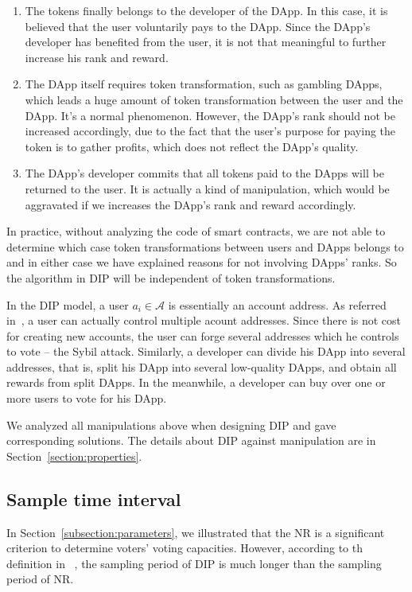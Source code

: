   \begin{enumerate}
  	 \item The tokens finally belongs to the developer of the DApp. In this case, it is believed that the user voluntarily pays to the DApp. Since the DApp's developer has benefited from the user, it is not that meaningful to further increase his rank and reward. 
  	\item The DApp itself requires token transformation, such as gambling DApps, which leads  a huge amount of token transformation between the user and the DApp. It's a normal phenomenon. However, the DApp's rank should not be increased accordingly, due to the fact that the user's purpose for paying the token is to gather profits, which does not reflect the DApp's quality.  
   \item The DApp's developer commits that all tokens paid to the DApps will be returned to the user. It is actually a kind of manipulation, which would be aggravated if we increases the DApp's rank and reward accordingly.  
  \end{enumerate}
  In practice, without analyzing the code of smart contracts, we are not able to determine which case token transformations between users and DApps belongs to and in either case we have explained reasons for not involving DApps' ranks. So the algorithm in DIP will be independent of token transformations. 
  
  In the DIP model, a user $a_i \in \mathcal{A}$ is essentially an account address. As referred in~\cite{Nebulasyellowpaper}, a user can actually control multiple acount addresses. Since there is not cost for creating new accounts, the user can forge several addresses which he controls to vote -- the Sybil attack. Similarly, a developer can divide his DApp into several addresses, that is, split his DApp into several low-quality DApps, and obtain all rewards from split DApps. In the meanwhile, a developer can buy over one or more users to vote for his DApp. 
  
  We analyzed all manipulations above when designing DIP and gave corresponding solutions. The details about DIP against manipulation are in Section~\ref{section:properties}.
  
  \subsection{Sample time interval}
  \label{subsection:interval}
  In Section~\ref{subsection:parameters}, we illustrated that the NR is a significant criterion to determine voters' voting capacities. However, according to th definition in ~\cite{Nebulasyellowpaper}, the sampling period of DIP is much longer than the sampling period of NR.


